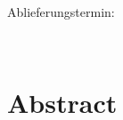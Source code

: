 \documentclass[12pt,letterpaper,ngerman]{article}
\begin{document}
\begin{center}
\begin{large}
Ablieferungstermin: \date{\today} \\
\end{large}
\end{center}

\vspace{1,5cm}

\newpage
\tableofcontents
\newpage

\setcounter{page}{1}
\pagestyle{fancy}
\fancyhf{}
\fancyhead[R]{\thepage}
\renewcommand{\headrulewidth}{0pt} %
\newtheorem{definition}{Definition}
\section*{Abstract}
\end{document}
